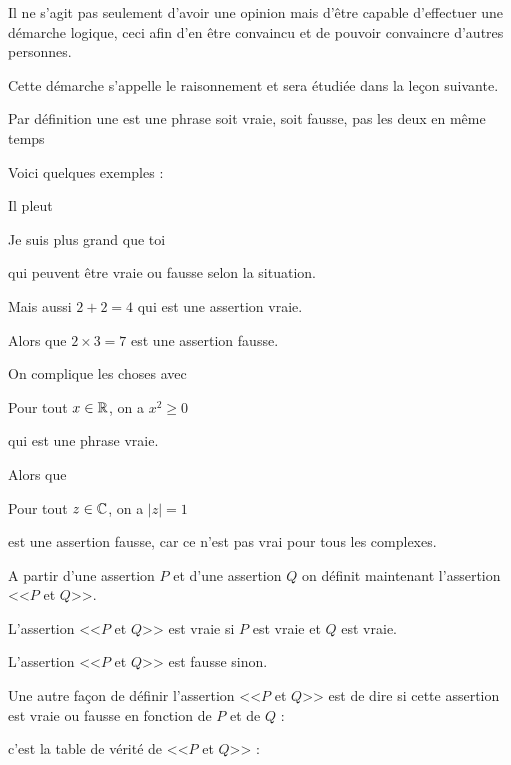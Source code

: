 \change

Il ne s'agit pas seulement d'avoir une opinion
mais d'être capable d'effectuer une démarche logique,
ceci afin d'en être convaincu et de pouvoir convaincre d'autres personnes.

\change 

Cette démarche s'appelle le raisonnement et sera étudiée
dans la leçon suivante.

\diapo

Par définition une  est une phrase soit vraie, 
soit fausse, pas les deux en même temps

\change

Voici quelques exemples :

\og Il pleut \fg

\og Je suis plus grand que toi \fg

qui peuvent être vraie ou fausse selon la situation.

\change

Mais aussi $2+2=4$ qui est une assertion vraie.

Alors que \og$2\times 3 = 7$\fg{} est une assertion fausse.


\change

On complique les choses avec 

Pour tout $x \in \mathbb{R}$, on a $x^2 \ge 0$

qui est une phrase vraie.

Alors que 

Pour tout $z\in \mathbb{C}$, on a $|z| = 1$

est une assertion fausse, car ce n'est pas vrai pour tous les complexes.



\diapo

A partir d'une assertion $P$ et d'une assertion $Q$
on définit maintenant l'assertion <<$P$ et $Q$>>.

L'assertion <<$P$ et $Q$>> est vraie si $P$ est vraie et $Q$ est vraie.

L'assertion <<$P$ et $Q$>> est fausse sinon.


\change

Une autre façon de définir l'assertion <<$P$ et $Q$>> est de dire
si cette assertion est vraie ou fausse en fonction de $P$ et de $Q$ :

c'est la table de vérité de <<$P$ et $Q$>> :

\change

